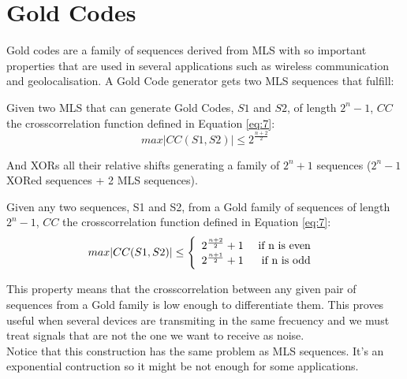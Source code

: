 \section{Gold Codes}

Gold codes are a family of sequences derived from MLS with so
important properties that are used in several applications such as wireless
communication and geolocalisation. A Gold Code generator gets two MLS sequences
that fulfill:

\begin{property}
  Given two MLS that can generate Gold Codes, $S1$ and $S2$, of length $2^{n}-
  1$, $CC$ the crosscorrelation function defined in Equation \ref{eq:7}:
    \begin{equation}
      max |CC(S1, S2)| \leq 2^{\frac{n+2}{2}}
    \end{equation}
\end{property}

And XORs all their relative shifts generating a family of $2^{n} + 1$ sequences
($2^{n} - 1$ XORed sequences + 2 MLS sequences).

\begin{property}
  Given any two sequences, S1 and S2, from a Gold family of sequences of length
  $2^{n}-1$, $CC$ the crosscorrelation function defined in Equation \ref{eq:7}:
  \begin{equation}
        max |CC(S1, S2)| \leq \left\{\begin{array}{lr}
            2^{\frac{n+2}{2}}+1 & \textnormal{ if n is even } \\
            2^{\frac{n+1}{2}}+1 & \textnormal{if n is odd } \\
        \end{array}\right.
  \end{equation}
\end{property}

This property means that the crosscorrelation between any given pair of
sequences from a Gold family is low enough to differentiate them. This proves
useful when several devices are transmiting in the same frecuency and we must
treat signals that are not the one we want to receive as noise.\\

Notice that this construction has the same problem as MLS sequences. It's
an exponential contruction so it might be not enough for some applications.
